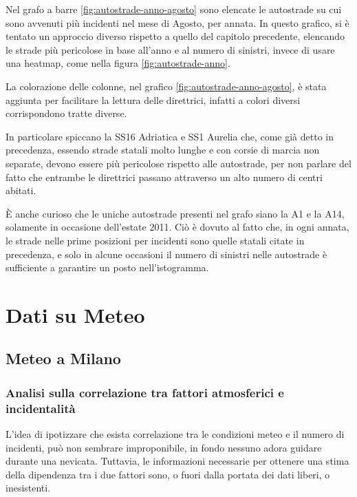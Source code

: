 \documentclass[a4paper,12pt]{report}
\begin{document}
Nel grafo a barre \ref{fig:autostrade-anno-agosto} sono elencate le 
autostrade su cui sono avvenuti più incidenti nel mese di Agosto, per annata. 
In questo grafico, si è tentato un approccio diverso rispetto a quello del capitolo precedente, 
elencando le strade più pericolose in base all'anno e al numero di sinistri, invece di usare una 
heatmap, come nella figura \ref{fig:autostrade-anno}. 

La colorazione delle colonne, nel grafico \ref{fig:autostrade-anno-agosto}, è stata aggiunta per 
facilitare la lettura delle direttrici, infatti a colori diversi corrispondono tratte diverse. 

In particolare spiccano la SS16 Adriatica e SS1 Aurelia che, come già 
detto in precedenza, essendo strade statali molto lunghe e con corsie di marcia 
non separate, devono essere più pericolose rispetto alle autostrade, 
per non parlare del fatto che entrambe le direttrici passano attraverso un 
alto numero di centri abitati. 

\`E anche curioso che le uniche autostrade presenti nel grafo siano la A1 e la A14, 
solamente in occasione dell'estate 2011. 
Ciò è dovuto al fatto che, in ogni annata, le strade nelle prime posizioni per incidenti sono 
quelle statali citate in precedenza, e solo in alcune occasioni il numero di sinistri 
nelle autostrade è sufficiente a garantire un posto nell'istogramma. 

\chapter{Dati su Meteo}

\section{Meteo a Milano}

\subsection{Analisi sulla correlazione tra fattori atmosferici e incidentalità}

L'idea di ipotizzare che esista correlazione tra le condizioni meteo e il numero 
di incidenti, può non sembrare improponibile, in fondo nessuno adora guidare 
durante una nevicata. 
Tuttavia, le informazioni necessarie per ottenere una stima della dipendenza 
tra i due fattori sono, o fuori dalla portata dei dati liberi, o inesistenti. 
\end{document}
